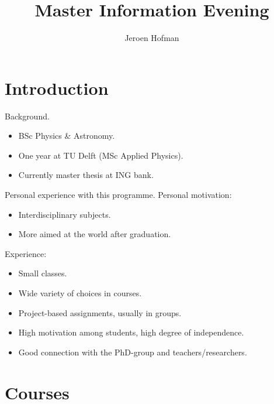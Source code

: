 \documentclass[red]{beamer}
\title
{Master Information Evening \\
}
\author
{Jeroen Hofman}
\institute
{
 Department of Computational Science\\
 University of Amsterdam}
\begin{document}

\begin{frame}
  \titlepage
\end{frame}

\section{Introduction}

\begin{frame}{Background.}
  \begin{itemize}
  \item 
    BSc Physics \& Astronomy.
  \item
    One year at TU Delft (MSc Applied Physics).
  \item
    Currently master thesis at ING bank.
  \end{itemize}
\end{frame}

\begin{frame}{Personal experience with this programme.}
  Personal motivation:
  \begin{itemize}
  \item 
    Interdisciplinary subjects.
  \item
    More aimed at the world after graduation.
  \end{itemize}
  Experience:
  \begin{itemize}
  \item 
    Small classes.
  \item
    Wide variety of choices in courses.
  \item
    Project-based assignments, usually in groups.
  \item
    High motivation among students, high degree of independence.
  \item
    Good connection with the PhD-group and teachers/researchers.
  \end{itemize}
\end{frame}

\section{Courses}
\end{document}
